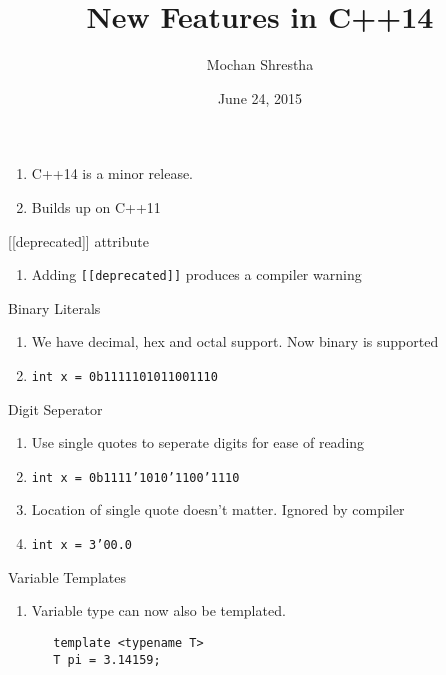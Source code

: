 \documentclass{beamer}
\title{New Features in C++14}
\author{Mochan Shrestha}
\institute{Ann Arbor C++ Meetup}
\date{June 24, 2015}
\begin{document}
\begin{frame}
\titlepage
\end{frame}

\begin{frame}[Introduction]
 \begin{enumerate}
  \item C++14 is a minor release.
  \item Builds up on C++11 
 \end{enumerate}
\end{frame}

\begin{frame}{[[deprecated]] attribute}
 \begin{enumerate}
  \item Adding \texttt{[[deprecated]]} produces a compiler warning
 \end{enumerate}
\end{frame}

\begin{frame}{Binary Literals}
 \begin{enumerate}
  \item We have decimal, hex and octal support. Now binary is supported
  \item \texttt{int x = 0b1111101011001110}
 \end{enumerate}
\end{frame}

\begin{frame}{Digit Seperator}
 \begin{enumerate}
  \item Use single quotes to seperate digits for ease of reading
  \item \texttt{int x = 0b1111'1010'1100'1110}
  \item Location of single quote doesn't matter. Ignored by compiler
  \item \texttt{int x = 3'00.0}
 \end{enumerate}
\end{frame}

\begin{frame}[fragile]{Variable Templates}
 \begin{enumerate}
  \item Variable type can now also be templated.
  \begin{lstlisting}
   template <typename T>
   T pi = 3.14159;
  \end{lstlisting}
 \end{enumerate}
\end{frame}
\end{document}
